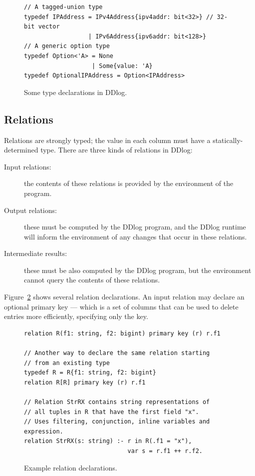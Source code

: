 \begin{figure}[t]
  \small
\begin{lstlisting}[language=ddlog]
// A tagged-union type
typedef IPAddress = IPv4Address{ipv4addr: bit<32>} // 32-bit vector
                  | IPv6Address{ipv6addr: bit<128>}
// A generic option type
typedef Option<'A> = None
                   | Some{value: 'A}
typedef OptionalIPAddress = Option<IPAddress>                   
\end{lstlisting}
\caption{Some type declarations in DDlog.\label{fig:types}}
\end{figure}

\subsection{Relations}

Relations are strongly typed; the value in each column must have a
statically-determined type.  There are three kinds of relations in
DDlog:
\begin{description}
\item[Input relations:] the contents of these relations is provided by
  the environment of the program.
\item[Output relations:] these must be computed by the DDlog program, and the
  DDlog runtime will inform the environment of any changes that
  occur in these relations.
\item[Intermediate results:] these must be also computed by the DDlog
  program, but the environment cannot query the contents of these
  relations.
\end{description}

Figure~\ref{fig:relations} shows several relation declarations.  An
input relation may declare an optional primary key --- which is a set
of columns that can be used to delete entries more efficiently,
specifying only the key.

\begin{figure}[t]
  \small
  \begin{lstlisting}[language=ddlog]
relation R(f1: string, f2: bigint) primary key (r) r.f1

// Another way to declare the same relation starting
// from an existing type
typedef R = R{f1: string, f2: bigint}
relation R[R] primary key (r) r.f1

// Relation StrRX contains string representations of
// all tuples in R that have the first field "x".
// Uses filtering, conjunction, inline variables and expression.
relation StrRX(s: string) :- r in R(.f1 = "x"),
                             var s = r.f1 ++ r.f2.
  \end{lstlisting}
  \caption{Example relation declarations.\label{fig:relations}}
\end{figure}

